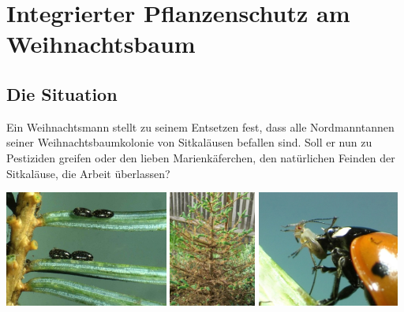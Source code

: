 \documentclass[%
11pt,%
twoside,%
titlepage,%
german,%
headsepline%
]{scrartcl}
\begin{document}
\clearpage




\clearpage

\section{Integrierter Pflanzenschutz am Weihnachtsbaum}
\subsection{Die Situation}
Ein Weihnachtsmann stellt zu seinem Entsetzen fest, dass alle Nordmanntannen seiner Weihnachtsbaumkolonie von Sitkaläusen befallen sind. Soll er nun zu Pestiziden greifen oder den lieben Marienkäferchen, den natürlichen Feinden der Sitkaläuse, die Arbeit überlassen?
\\[2ex]

\begin{center}
\includegraphics[height=3.8cm]{pictures/sitkalauseier.jpg}
\includegraphics[height=3.8cm]{pictures/tannenbaum.jpg}
\includegraphics[height=3.8cm]{pictures/marienkaefer.jpg}
\end{center}
\end{document}
